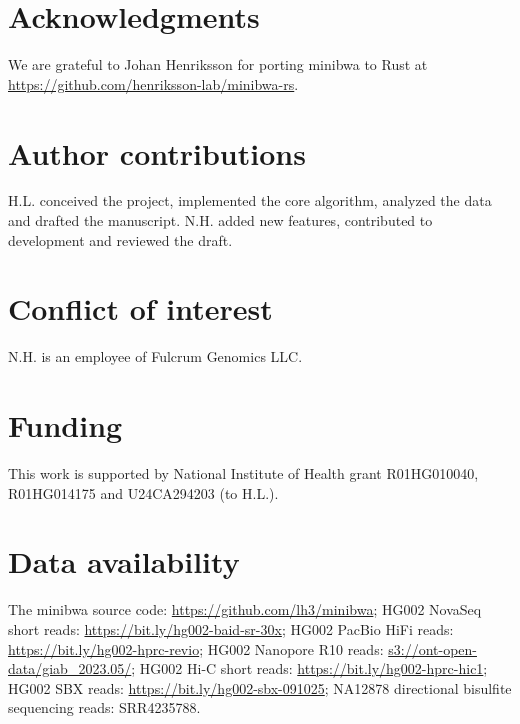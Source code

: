 \documentclass[webpdf,contemporary,large,namedate]{oup-authoring-template}%
\begin{document}
\section*{Acknowledgments}

We are grateful to Johan Henriksson for porting minibwa to Rust at \url{https://github.com/henriksson-lab/minibwa-rs}.

\section*{Author contributions}

H.L. conceived the project, implemented the core algorithm, analyzed the data and drafted the manuscript.
N.H. added new features, contributed to development and reviewed the draft.

\section*{Conflict of interest}

N.H. is an employee of Fulcrum Genomics LLC.

\section*{Funding}

This work is supported by National Institute of Health grant R01HG010040, R01HG014175 and U24CA294203 (to H.L.).

\section*{Data availability}

The minibwa source code: \url{https://github.com/lh3/minibwa};
HG002 NovaSeq short reads: \url{https://bit.ly/hg002-baid-sr-30x};
HG002 PacBio HiFi reads: \url{https://bit.ly/hg002-hprc-revio};
HG002 Nanopore R10 reads: \url{s3://ont-open-data/giab\_2023.05/};
HG002 Hi-C short reads: \url{https://bit.ly/hg002-hprc-hic1};
HG002 SBX reads: \url{https://bit.ly/hg002-sbx-091025};
NA12878 directional bisulfite sequencing reads: SRR4235788.


{\sffamily\small
}
\end{document}
